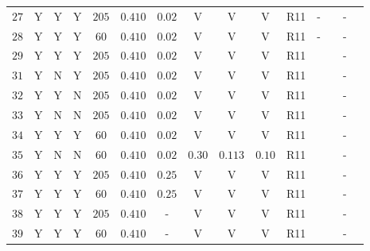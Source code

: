 \begin{table}[tbp]
{\begin{tabular}{lcccccccccccccr}
\rule[-1ex]{0pt}{2.5ex} $27$ & Y & Y & Y & $205$ & $0.410$ & $0.02$ & V & V & V & R11 & - & \cite{Pietrzynski:2013gia} & - & \cite{vanLeeuwen:2007xw} \\
\rule[-1ex]{0pt}{2.5ex} $28$ & Y & Y & Y & $60$ & $0.410$ & $0.02$ & V & V & V & R11 & - & \cite{Pietrzynski:2013gia} & - & \cite{vanLeeuwen:2007xw} \\
\rule[-1ex]{0pt}{2.5ex} $29$ & Y & Y & Y & $205$ & $0.410$ & $0.02$ & V & V & V & R11 & \cite{Humphreys:2013eja} & \cite{Pietrzynski:2013gia} & - & \cite{vanLeeuwen:2007xw} \\ 
\rule[-1ex]{0pt}{2.5ex} $31$ & Y & N & Y & $205$ & $0.410$ & $0.02$ & V & V & V & R11 & \cite{Humphreys:2013eja} & \cite{Pietrzynski:2013gia} & - & \cite{vanLeeuwen:2007xw} \\
\rule[-1ex]{0pt}{2.5ex} $32$ & Y & Y & N & $205$ & $0.410$ & $0.02$ & V & V & V & R11 & \cite{Humphreys:2013eja} & \cite{Pietrzynski:2013gia} & - & \cite{vanLeeuwen:2007xw} \\
\rule[-1ex]{0pt}{2.5ex} $33$ & Y & N & N & $205$ & $0.410$ & $0.02$ & V & V & V & R11 & \cite{Humphreys:2013eja} & \cite{Pietrzynski:2013gia} & - & \cite{vanLeeuwen:2007xw} \\
\rule[-1ex]{0pt}{2.5ex} $34$ & Y & Y & Y & $60$ & $0.410$ & $0.02$ & V & V & V & R11 & \cite{Humphreys:2013eja} & \cite{Pietrzynski:2013gia} & - & \cite{vanLeeuwen:2007xw} \\
\rule[-1ex]{0pt}{2.5ex} $35$ & Y & N & N & $60$ & $0.410$ & $0.02$ & $0.30$ & $0.113$ & $0.10$ & R11 & \cite{Humphreys:2013eja} & \cite{Pietrzynski:2013gia} & - & \cite{vanLeeuwen:2007xw} \\
\rule[-1ex]{0pt}{2.5ex} $36$ & Y & Y & Y & $205$ & $0.410$ & $0.25$ & V & V & V & R11 & \cite{Humphreys:2013eja} & \cite{Pietrzynski:2013gia} & - & \cite{vanLeeuwen:2007xw} \\
\rule[-1ex]{0pt}{2.5ex} $37$ & Y & Y & Y & $60$ & $0.410$ & $0.25$ & V & V & V & R11 & \cite{Humphreys:2013eja} & \cite{Pietrzynski:2013gia} & - & \cite{vanLeeuwen:2007xw} \\
\rule[-1ex]{0pt}{2.5ex} $38$ & Y & Y & Y & $205$ & $0.410$ & - & V & V & V & R11 & \cite{Humphreys:2013eja} & \cite{Pietrzynski:2013gia} & - & \cite{vanLeeuwen:2007xw} \\
\rule[-1ex]{0pt}{2.5ex} $39$ & Y & Y & Y & $60$ & $0.410$ & - & V & V & V & R11 & \cite{Humphreys:2013eja} & \cite{Pietrzynski:2013gia} & - & \cite{vanLeeuwen:2007xw} \\ 


\end{tabular}}
\end{table}
